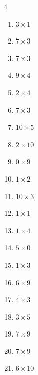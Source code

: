 \begin{multicols}{4}
\begin{enumerate}
  \item $3\times 1$
        \phantom{$=3$}

  \item $7\times 3$
        \phantom{$=21$}

  \item $7\times 3$
        \phantom{$=21$}

  \item $9\times 4$
        \phantom{$=36$}

  \item $2\times 4$
        \phantom{$=8$}

  \item $7\times 3$
        \phantom{$=21$}

  \item $10\times 5$
        \phantom{$=50$}

\columnbreak %

  \item $2\times 10$
        \phantom{$=20$}

  \item $0\times 9$
        \phantom{$=0$}

  \item $1\times 2$
        \phantom{$=2$}

  \item $10\times 3$
        \phantom{$=30$}

  \item $1\times 1$
        \phantom{$=1$}

  \item $1\times 4$
        \phantom{$=4$}

  \item $5\times 0$
        \phantom{$=0$}

  \item $1\times 3$
        \phantom{$=3$}

  \item $6\times 9$
        \phantom{$=54$}

  \item $4\times 3$
        \phantom{$=12$}

  \item $3\times 5$
        \phantom{$=15$}

  \item $7\times 9$
        \phantom{$=63$}

  \item $7\times 9$
        \phantom{$=63$}

  \item $6\times 10$
        \phantom{$=60$}


\end{enumerate}
\end{multicols}
